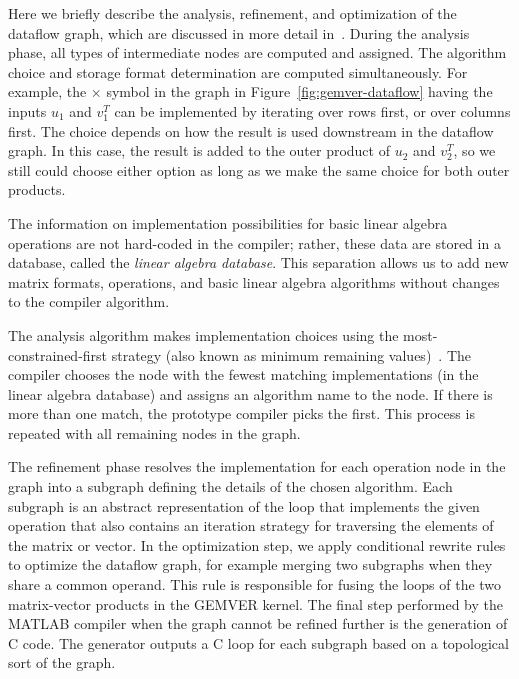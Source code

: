 \documentclass[runningheads]{llncs}
\begin{document}
Here we briefly describe the analysis, refinement, and optimization of the
dataflow graph, which are discussed in more detail in~\cite{Siek}. During the
analysis phase, all types of intermediate nodes are computed and
assigned. The algorithm choice and storage format determination are computed
simultaneously. For example, the $\times$ symbol in the graph in
Figure~\ref{fig:gemver-dataflow} having the inputs $u_1$ and $v_1^T$ can be
implemented by iterating over rows first, or over columns first. The choice
depends on how the result is used downstream in the dataflow graph.  In this
case, the result is added to the outer product of $u_2$ and $v_2^T$, so we
still could choose either option as long as we make the same choice for both
outer products. 

The information on implementation possibilities for basic linear algebra
operations are not hard-coded in the compiler; rather, these data are stored
in a database, called the \emph{linear algebra database}.  This separation
allows us to add new matrix formats, operations, and basic linear algebra
algorithms without changes to the compiler algorithm.

The analysis algorithm makes implementation choices using the
most-con\-strained-first strategy (also known as minimum remaining
values)~\cite{Russell:2003mz}.  The compiler chooses the node with the fewest
matching implementations (in the linear algebra database) and assigns an
algorithm name to the node.  If there is more than one match, the prototype
compiler picks the first.  This process is repeated with all remaining nodes
in the graph.

The refinement phase resolves the implementation for each operation node in
the graph into a subgraph defining the details of the chosen algorithm.  Each
subgraph is an abstract representation of the loop that implements the given
operation that also contains an iteration strategy for traversing the
elements of the matrix or vector.
In the optimization step, we apply conditional rewrite rules to optimize the
dataflow graph, for example merging two subgraphs when they share a common
operand. This rule is responsible for fusing the loops of the two
matrix-vector products in the GEMVER kernel.  
The final step performed by the MATLAB compiler when the graph cannot be
refined further is the generation of C code. The generator outputs a C loop
for each subgraph based on a topological sort of the graph. 
\end{document}
